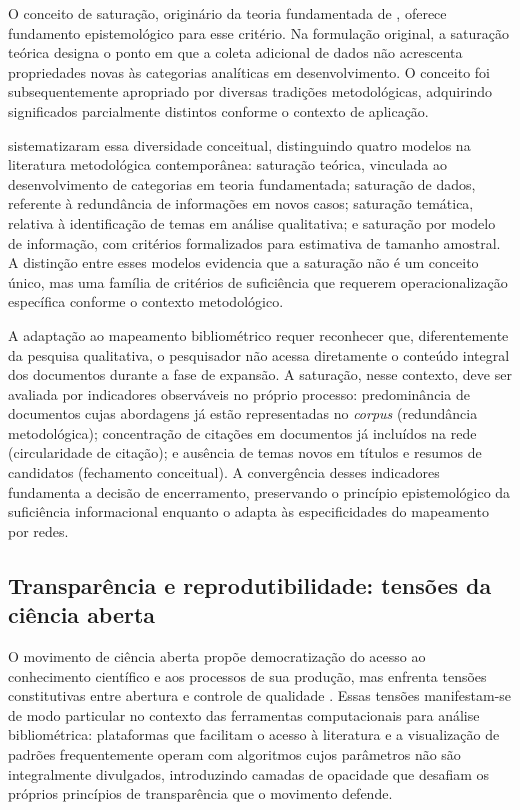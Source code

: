 \documentclass[portuguese]{textolivre}
\begin{document}
	O conceito de saturação, originário da teoria fundamentada de \textcite{Glaser1967}, oferece fundamento epistemológico para esse critério. Na formulação original, a saturação teórica designa o ponto em que a coleta adicional de dados não acrescenta propriedades novas às categorias analíticas em desenvolvimento. O conceito foi subsequentemente apropriado por diversas tradições metodológicas, adquirindo significados parcialmente distintos conforme o contexto de aplicação.
    
	\textcite{Saunders2018} sistematizaram essa diversidade conceitual, distinguindo quatro modelos na literatura metodológica contemporânea: saturação teórica, vinculada ao desenvolvimento de categorias em teoria fundamentada; saturação de dados, referente à redundância de informações em novos casos; saturação temática, relativa à identificação de temas em análise qualitativa; e saturação por modelo de informação, com critérios formalizados para estimativa de tamanho amostral. A distinção entre esses modelos evidencia que a saturação não é um conceito único, mas uma família de critérios de suficiência que requerem operacionalização específica conforme o contexto metodológico.
    
	A adaptação ao mapeamento bibliométrico requer reconhecer que, diferentemente da pesquisa qualitativa, o pesquisador não acessa diretamente o conteúdo integral dos documentos durante a fase de expansão. A saturação, nesse contexto, deve ser avaliada por indicadores observáveis no próprio processo: predominância de documentos cujas abordagens já estão representadas no \textit{corpus} (redundância metodológica); concentração de citações em documentos já incluídos na rede (circularidade de citação); e ausência de temas novos em títulos e resumos de candidatos (fechamento conceitual). A convergência desses indicadores fundamenta a decisão de encerramento, preservando o princípio epistemológico da suficiência informacional enquanto o adapta às especificidades do mapeamento por redes.


\subsection{Transparência e reprodutibilidade: tensões da ciência aberta}\label{sec-modelo}
O movimento de ciência aberta propõe democratização do acesso ao conhecimento científico e aos processos de sua produção, mas enfrenta tensões constitutivas entre abertura e controle de qualidade \cite{Quintanilha2019}. Essas tensões manifestam-se de modo particular no contexto das ferramentas computacionais para análise bibliométrica: plataformas que facilitam o acesso à literatura e a visualização de padrões frequentemente operam com algoritmos cujos parâmetros não são integralmente divulgados, introduzindo camadas de opacidade que desafiam os próprios princípios de transparência que o movimento defende.
\end{document}
